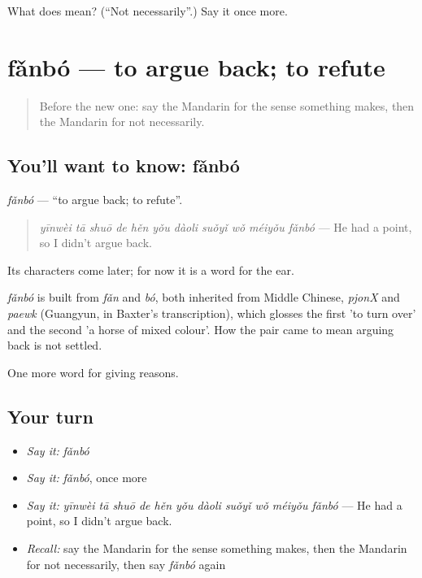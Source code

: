 \begin{tcolorbox}[breakable,colback=teal!4,colframe=teal!35!black,title={Before you move on}]
What does  mean? (\textquotedblleft{}Not necessarily\textquotedblright{}.) Say it once more.
\end{tcolorbox}
\section[fǎnbó]{fǎnbó — to argue back; to refute}

\label{lesson:ZH-C353-fanbo}



\begin{quote}
Before the new one: say the Mandarin for the sense something makes, then the Mandarin for not necessarily.
\end{quote}

\subsection*{You'll want to know: fǎnbó}
\emph{fǎnbó} — \textquotedblleft{}to argue back; to refute\textquotedblright{}.

\begin{quote}
\emph{yīnwèi tā shuō de hěn yǒu dàoli suǒyǐ wǒ méiyǒu fǎnbó} — He had a point, so I didn't argue back.
\end{quote}

Its characters come later; for now it is a word for the ear.

\begin{cousinweb}
\emph{fǎnbó} is built from \emph{fǎn} and \emph{bó}, both inherited from Middle Chinese, \emph{pjonX} and \emph{paewk} (Guangyun, in Baxter's transcription), which glosses the first 'to turn over' and the second 'a horse of mixed colour'. How the pair came to mean arguing back is not settled.
\end{cousinweb}

\begin{grammarlens}[title={What you've built}]
One more word for giving reasons.
\end{grammarlens}

\subsection*{Your turn}
\begin{itemize}
\raggedright
  \item \emph{Say it:} \emph{fǎnbó}
  \item \emph{Say it:} \emph{fǎnbó}, once more
  \item \emph{Say it:} \emph{yīnwèi tā shuō de hěn yǒu dàoli suǒyǐ wǒ méiyǒu fǎnbó} — He had a point, so I didn't argue back.
  \item \emph{Recall:} say the Mandarin for the sense something makes, then the Mandarin for not necessarily, then say \emph{fǎnbó} again
\end{itemize}

